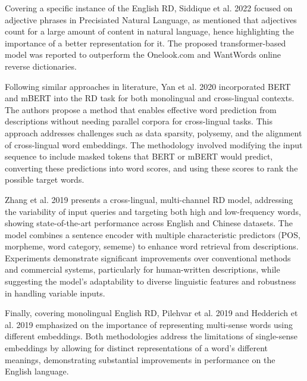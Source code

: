 \documentclass[12pt]{article}
\begin{document}
Covering a specific instance of the English RD, Siddique et al. 2022 \cite{Siddique2022} focused on adjective phrases in Precisiated Natural Language, as mentioned that adjectives count for a large amount of content in natural language, hence highlighting the importance of a better representation for it. The proposed transformer-based model was reported to outperform the Onelook.com and WantWords online reverse dictionaries.

Following similar approaches in literature, Yan et al. 2020 \cite{Yan2020} incorporated BERT and mBERT into the RD task for both monolingual and cross-lingual contexts. The authors propose a method that enables effective word prediction from descriptions without needing parallel corpora for cross-lingual tasks. This approach addresses challenges such as data sparsity, polysemy, and the alignment of cross-lingual word embeddings. The methodology involved modifying the input sequence to include masked tokens that BERT or mBERT would predict, converting these predictions into word scores, and using these scores to rank the possible target words.

Zhang et al. 2019 \cite{Zhang2019} presents a cross-lingual, multi-channel RD model, addressing the variability of input queries and targeting both high and low-frequency words, showing state-of-the-art performance across English and Chinese datasets. The model combines a sentence encoder with multiple characteristic predictors (POS, morpheme, word category, sememe) to enhance word retrieval from descriptions. Experiments demonstrate significant improvements over conventional methods and commercial systems, particularly for human-written descriptions, while suggesting the model's adaptability to diverse linguistic features and robustness in handling variable inputs.

Finally, covering monolingual English RD, Pilehvar et al. 2019 \cite{Pilehvar2019} and Hedderich et al. 2019 \cite{Hedderich2019} emphasized on the importance of representing multi-sense words using different embeddings. Both methodologies address the limitations of single-sense embeddings by allowing for distinct representations of a word's different meanings, demonstrating substantial improvements in performance on the English language.
\end{document}
